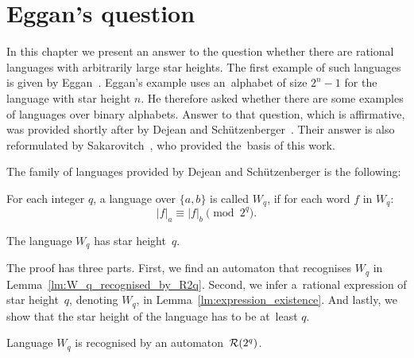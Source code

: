 \chapter{Eggan's question}

In this chapter we present an answer to the question whether there are rational languages with arbitrarily large star heights. The first example of such languages is given by Eggan~\cite{Eggan63}. Eggan's example uses an~alphabet of size $2^n - 1$ for the language with star height $n$. He therefore asked whether there are some examples of languages over binary alphabets. Answer to that question, which is affirmative, was provided shortly after by Dejean and Schützenberger~\cite{DejeanSchutzenberger66}. Their answer is also reformulated by Sakarovitch~\cite{Sakarovitch09}, who provided the~basis of this work.

The family of languages provided by Dejean and Schützenberger is the following:

\begin{defn}
    For each integer $q$, a language over $\{a, b\}$ is called $W_q$, if for each word $f$ in $W_q$:
    \[
        |f|_a \equiv |f|_b \pmod{2^q}.
    \]
\end{defn}

\begin{thm}\label{thm:main}
    The language $W_q$ has star height~$q$.
\end{thm}

The proof has three parts. First, we find an automaton that recognises $W_q$ in Lemma~\ref*{lm:W_q_recognised_by_R2q}. Second, we infer a~rational expression of star height~$q$, denoting $W_q$, in Lemma~\ref*{lm:expression_existence}. And lastly, we show that the star height of the language has to be at~least $q$.

\begin{lemma}\label{lm:W_q_recognised_by_R2q}
    Language $W_q$ is recognised by an automaton~${\mathcal{R}}(2^q)$.
\end{lemma}

